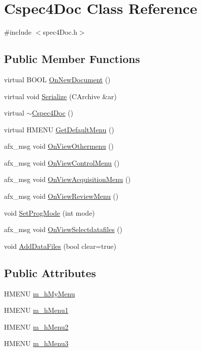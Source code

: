 \hypertarget{classCspec4Doc}{
\section{Cspec4Doc Class Reference}
\label{classCspec4Doc}
}


{\ttfamily \#include $<$spec4Doc.h$>$}

\subsection*{Public Member Functions}
\begin{DoxyCompactItemize}
\item 
virtual BOOL \hyperlink{classCspec4Doc_af583fe4cb3f9c0e495c069d1da2e464c}{OnNewDocument} ()
\item 
virtual void \hyperlink{classCspec4Doc_a85f6508e1f0fc2aa6c6dcd1de8d4fe9e}{Serialize} (CArchive \&ar)
\item 
virtual \hyperlink{classCspec4Doc_a25878ea1326d4aca675c3e02cf4a464b}{$\sim$Cspec4Doc} ()
\item 
virtual HMENU \hyperlink{classCspec4Doc_a9f4d0d3d655628a00edbf238f337d402}{GetDefaultMenu} ()
\item 
afx\_\-msg void \hyperlink{classCspec4Doc_ae7e065c2727c68607c127054f01ea191}{OnViewOthermenu} ()
\item 
afx\_\-msg void \hyperlink{classCspec4Doc_ad84df9bfba29e794f075117e9a3bba00}{OnViewControlMenu} ()
\item 
afx\_\-msg void \hyperlink{classCspec4Doc_a8389a6a2f8378552578ae010c277e7d4}{OnViewAcquisitionMenu} ()
\item 
afx\_\-msg void \hyperlink{classCspec4Doc_a81368b7b8ac095f0fb4570cf73c30b82}{OnViewReviewMenu} ()
\item 
void \hyperlink{classCspec4Doc_a7479b4cb87b11f5753ca937c22a6d361}{SetProgMode} (int mode)
\item 
afx\_\-msg void \hyperlink{classCspec4Doc_a9ee802564838bb10454a97b70bd215b3}{OnViewSelectdatafiles} ()
\item 
void \hyperlink{classCspec4Doc_aaa38af456567e05554ebc34f76100061}{AddDataFiles} (bool clear=true)
\end{DoxyCompactItemize}
\subsection*{Public Attributes}
\begin{DoxyCompactItemize}
\item 
HMENU \hyperlink{classCspec4Doc_a1c22de6ba161ce480dda949516bf72f9}{m\_\-hMyMenu}
\item 
HMENU \hyperlink{classCspec4Doc_ad1aadefc63e840d5e456e47542066a86}{m\_\-hMenu1}
\item 
HMENU \hyperlink{classCspec4Doc_ad7b26f7b7abdcfef3890d1dd178885f2}{m\_\-hMenu2}
\item 
HMENU \hyperlink{classCspec4Doc_ab80ce81fc7bafe5ecfc0e3e971b6ec7c}{m\_\-hMenu3}
\end{DoxyCompactItemize}
